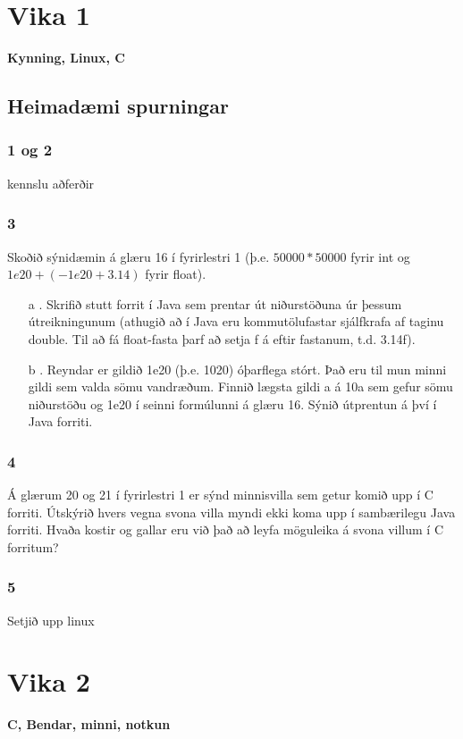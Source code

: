 \documentclass{article}
\begin{document}
\newpage
\section{Vika 1}
\large{\textbf{Kynning, Linux, C}}

\subsection{Heimadæmi spurningar}

\subsubsection{1 og 2}
kennslu aðferðir

\subsubsection{3}
Skoðið sýnidæmin á glæru 16 í fyrirlestri 1 (þ.e. $50000 * 50000$ fyrir int og $1e20 +
(-1e20 + 3.14)$ fyrir float).
\begin{itemize}
    \item[a]. Skrifið stutt forrit í Java sem prentar út niðurstöðuna úr þessum útreikningunum
(athugið að í Java eru kommutölufastar sjálfkrafa af taginu double. Til að fá
float-fasta þarf að setja f á eftir fastanum, t.d. 3.14f).
\item[b] . Reyndar er gildið 1e20 (þ.e. 1020) óþarflega stórt. Það eru til mun minni gildi
sem valda sömu vandræðum. Finnið lægsta gildi a á 10a sem gefur sömu
niðurstöðu og 1e20 í seinni formúlunni á glæru 16. Sýnið útprentun á því í Java
forriti.
\end{itemize}

\subsubsection{4}
Á glærum 20 og 21 í fyrirlestri 1 er sýnd minnisvilla sem getur komið upp í C forriti.
Útskýrið hvers vegna svona villa myndi ekki koma upp í sambærilegu Java forriti.
Hvaða kostir og gallar eru við það að leyfa möguleika á svona villum í C forritum?

\subsubsection{5}
Setjið upp linux



\newpage
\section{Vika 2}
\large{\textbf{C, Bendar, minni, notkun}}
\end{document}
